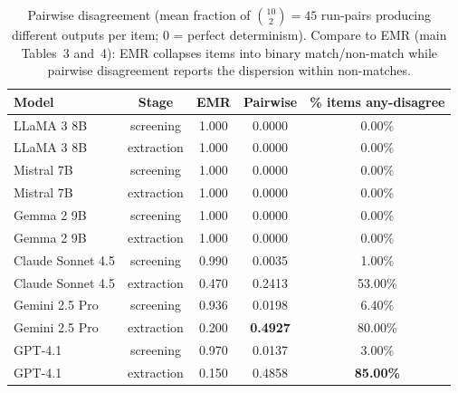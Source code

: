 \documentclass[11pt]{article}
\newenvironment{fittab}{\begin{lrbox}{\fittabbox}}{\end{lrbox}%
  \ifdim\wd\fittabbox>\linewidth\resizebox{\linewidth}{!}{\usebox{\fittabbox}}\else\usebox{\fittabbox}\fi}
\begin{document}
\begin{table}[htbp]
\centering
\caption{Pairwise disagreement (mean fraction of $\binom{10}{2}{=}45$ run-pairs producing different outputs per item; 0 = perfect determinism). Compare to EMR (main Tables~3 and~4): EMR collapses items into binary match/non-match while pairwise disagreement reports the dispersion within non-matches.}
\label{tab:pairwise}
\begin{fittab}\begin{tabular}{lcccc}
\toprule
\textbf{Model} & \textbf{Stage} & \textbf{EMR} & \textbf{Pairwise} & \textbf{\% items any-disagree} \\
\midrule
LLaMA 3 8B & screening  & 1.000 & 0.0000 & 0.00\% \\
LLaMA 3 8B & extraction & 1.000 & 0.0000 & 0.00\% \\
Mistral 7B & screening  & 1.000 & 0.0000 & 0.00\% \\
Mistral 7B & extraction & 1.000 & 0.0000 & 0.00\% \\
Gemma 2 9B & screening  & 1.000 & 0.0000 & 0.00\% \\
Gemma 2 9B & extraction & 1.000 & 0.0000 & 0.00\% \\
\midrule
Claude Sonnet 4.5 & screening  & 0.990 & 0.0035 & 1.00\% \\
Claude Sonnet 4.5 & extraction & 0.470 & 0.2413 & 53.00\% \\
Gemini 2.5 Pro    & screening  & 0.936 & 0.0198 & 6.40\% \\
Gemini 2.5 Pro    & extraction & 0.200 & \textbf{0.4927} & 80.00\% \\
GPT-4.1           & screening  & 0.970 & 0.0137 & 3.00\% \\
GPT-4.1           & extraction & 0.150 & 0.4858 & \textbf{85.00\%} \\
\bottomrule
\end{tabular}\end{fittab}
\end{table}
\end{document}
